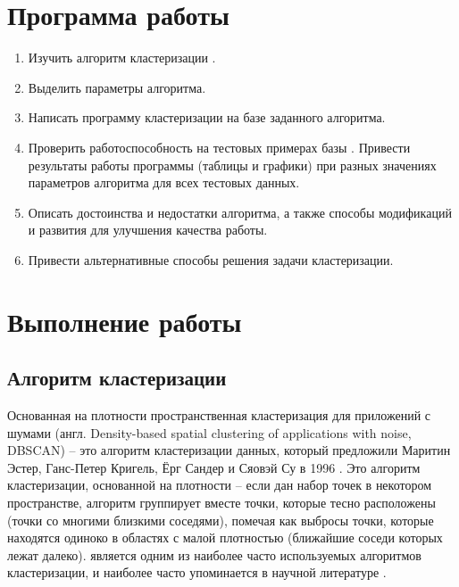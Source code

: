 





\tableofcontents
\newpage

\section{Программа работы}

\begin{enumerate}
	\item Изучить алгоритм кластеризации .
	\item Выделить параметры алгоритма.
	\item Написать программу кластеризации на базе заданного алгоритма.
	\item Проверить работоспособность на тестовых примерах базы \cite{data}. Привести результаты работы программы (таблицы и графики) при разных значениях параметров алгоритма для всех тестовых данных.
	\item Описать достоинства и недостатки алгоритма, а также способы модификаций и развития для улучшения качества работы.
	\item Привести альтернативные способы решения задачи кластеризации.
\end{enumerate}

\section{Выполнение работы}

\subsection{Алгоритм кластеризации }

Основанная на плотности пространственная кластеризация для приложений с шумами (англ. Density-based spatial clustering of applications with noise, DBSCAN) -- это алгоритм кластеризации данных, который предложили Маритин Эстер, Ганс-Петер Кригель, Ёрг Сандер и Сяовэй Су в 1996 \cite{dbscan}. Это алгоритм кластеризации, основанной на плотности -- если дан набор точек в некотором пространстве, алгоритм группирует вместе точки, которые тесно расположены (точки со многими близкими соседями), помечая как выбросы точки, которые находятся одиноко в областях с малой плотностью (ближайшие соседи которых лежат далеко).  является одним из наиболее часто используемых алгоритмов кластеризации, и наиболее часто упоминается в научной литературе \cite{wiki}.

